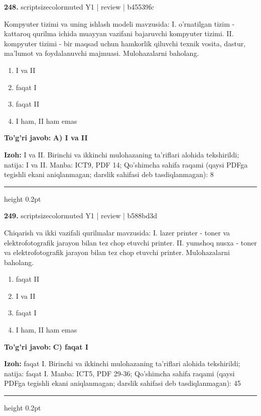 \documentclass[10pt,a4paper]{article}
\begin{document}
{\bfseries\sffamily\color{ink} 248.} {scriptsizecolor{muted} Y1 | review | b45539fc}
\par
Kompyuter tizimi va uning ishlash modeli mavzusida: I. o'rnatilgan tizim - kattaroq qurilma ichida muayyan vazifani bajaruvchi kompyuter tizimi. II. kompyuter tizimi - bir maqsad uchun hamkorlik qiluvchi texnik vosita, dastur, ma'lumot va foydalanuvchi majmuasi. Mulohazalarni baholang.
\begin{enumerate}[label=\Alph*),leftmargin=9mm]
\item I va II
\item faqat I
\item faqat II
\item I ham, II ham emas
\end{enumerate}
\begin{tcolorbox}[enhanced,breakable,colback=teal!4,colframe=teal!60!black,boxrule=0.45pt,arc=1.2mm,left=2.7mm,right=2.7mm,top=1.8mm,bottom=1.8mm,before skip=2mm,after skip=2mm]
{\bfseries\sffamily\color{teal}To'g'ri javob:} \textbf{A) I va II}
\par\smallskip
{\bfseries Izoh:} I va II. Birinchi va ikkinchi mulohazaning ta'riflari alohida tekshirildi; natija: I va II. Manba: ICT9, PDF 14; Qo'shimcha sahifa raqami (qaysi PDFga tegishli ekani aniqlanmagan; darslik sahifasi deb tasdiqlanmagan): 8
\end{tcolorbox}
\vspace{2mm}\hrule height 0.2pt\vspace{3mm}

{\bfseries\sffamily\color{ink} 249.} {scriptsizecolor{muted} Y1 | review | b588bd3d}
\par
Chiqarish va ikki vazifali qurilmalar mavzusida: I. lazer printer - toner va elektrofotografik jarayon bilan tez chop etuvchi printer. II. yumshoq nusxa - toner va elektrofotografik jarayon bilan tez chop etuvchi printer. Mulohazalarni baholang.
\begin{enumerate}[label=\Alph*),leftmargin=9mm]
\item faqat II
\item I va II
\item faqat I
\item I ham, II ham emas
\end{enumerate}
\begin{tcolorbox}[enhanced,breakable,colback=teal!4,colframe=teal!60!black,boxrule=0.45pt,arc=1.2mm,left=2.7mm,right=2.7mm,top=1.8mm,bottom=1.8mm,before skip=2mm,after skip=2mm]
{\bfseries\sffamily\color{teal}To'g'ri javob:} \textbf{C) faqat I}
\par\smallskip
{\bfseries Izoh:} faqat I. Birinchi va ikkinchi mulohazaning ta'riflari alohida tekshirildi; natija: faqat I. Manba: ICT5, PDF 29-36; Qo'shimcha sahifa raqami (qaysi PDFga tegishli ekani aniqlanmagan; darslik sahifasi deb tasdiqlanmagan): 45
\end{tcolorbox}
\vspace{2mm}\hrule height 0.2pt\vspace{3mm}
\end{document}
